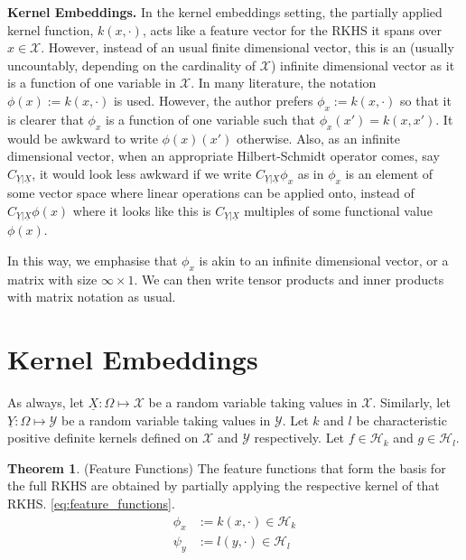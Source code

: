 \documentclass[twoside]{article} \usepackage{aistats2017}
\theoremstyle{definition}
\newtheorem{theorem}{Theorem}[section]
\newcommand{\rv}[1]{\underline{#1}}
\newcommand{\Hk}{\mathcal{H}_{k}}
\newcommand{\Hl}{\mathcal{H}_{l}}
\begin{document}
	\textbf{Kernel Embeddings.} In the kernel embeddings setting, the partially applied kernel function, $k(x, \cdot)$, acts like a feature vector for the RKHS it spans over $x \in \mathcal{X}$. However, instead of an usual finite dimensional vector, this is an (usually uncountably, depending on the cardinality of $\mathcal{X}$) infinite dimensional vector as it is a function of one variable in $\mathcal{X}$. In many literature, the notation $\phi(x) := k(x, \cdot)$ is used. However, the author prefers $\phi_{x} := k(x, \cdot)$ so that it is clearer that $\phi_{x}$ is a function of one variable such that $\phi_{x}(x') = k(x, x')$. It would be awkward to write $\phi(x)(x')$ otherwise. Also, as an infinite dimensional vector, when an appropriate Hilbert-Schmidt operator comes, say $C_{\rv{Y} | \rv{X}}$, it would look less awkward if we write $C_{\rv{Y} | \rv{X}} \phi_{x}$ as in $\phi_{x}$ is an element of some vector space where linear operations can be applied onto, instead of $C_{\rv{Y} | \rv{X}} \phi(x)$ where it looks like this is $C_{\rv{Y} | \rv{X}}$ multiples of some functional value $\phi(x)$.
	
	In this way, we emphasise that $\phi_{x}$ is akin to an infinite dimensional vector, or a matrix with size $\infty \times 1$. We can then write tensor products and inner products with matrix notation as usual.
	
\section{Kernel Embeddings}

	As always, let $\rv{X} : \Omega \mapsto \mathcal{X}$ be a random variable taking values in $\mathcal{X}$. Similarly, let $\rv{Y} : \Omega \mapsto \mathcal{Y}$ be a random variable taking values in $\mathcal{Y}$. Let $k$ and $l$ be characteristic positive definite kernels defined on $\mathcal{X}$ and $\mathcal{Y}$ respectively. Let $f \in \Hk$ and $g \in \Hl$.
		

	\begin{theorem} \label{thm:feature_functions}
		(Feature Functions)
		The feature functions that form the basis for the full RKHS are obtained by partially applying the respective kernel of that RKHS. \eqref{eq:feature_functions}.
		\begin{equation}
		\begin{aligned}
			\phi_{x} &:= k(x, \cdot) \in \Hk \\
			\psi_{y} &:= l(y, \cdot) \in \Hl
		\label{eq:feature_functions}
		\end{aligned}
		\end{equation}
	\end{theorem}
\end{document}

